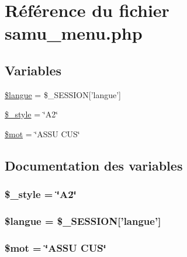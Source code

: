 \hypertarget{samu__menu_8php}{
\section{R\'{e}f\'{e}rence du fichier samu\_\-menu.php}
\label{samu__menu_8php}
}
\subsection*{Variables}
\begin{CompactItemize}
\item 
\hyperlink{samu__menu_8php_a0}{\$langue} = \$\_\-SESSION\mbox{[}'langue'\mbox{]}
\item 
\hyperlink{samu__menu_8php_a1}{\$\_\-style} = \char`\"{}A2\char`\"{}
\item 
\hyperlink{samu__menu_8php_a2}{\$mot} = \char`\"{}ASSU CUS\char`\"{}
\end{CompactItemize}


\subsection{Documentation des variables}
\hypertarget{samu__menu_8php_a1}{
\subsubsection[\$\_\-style]{\setlength{\rightskip}{0pt plus 5cm}\$\_\-style = \char`\"{}A2\char`\"{}}}
\label{samu__menu_8php_a1}


\hypertarget{samu__menu_8php_a0}{
\subsubsection[\$langue]{\setlength{\rightskip}{0pt plus 5cm}\$langue = \$\_\-SESSION\mbox{[}'langue'\mbox{]}}}
\label{samu__menu_8php_a0}


\hypertarget{samu__menu_8php_a2}{
\subsubsection[\$mot]{\setlength{\rightskip}{0pt plus 5cm}\$mot = \char`\"{}ASSU CUS\char`\"{}}}
\label{samu__menu_8php_a2}


